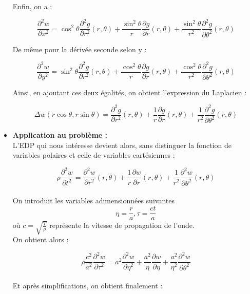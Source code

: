 \documentclass[a4,12pt]{article}
\begin{document}
\begin{itemize}
			      Enfin, on a :

			      \[
				\dfrac{\partial^2 w}{\partial x^2} = \cos^2 \theta \dfrac{\partial^2 g}{\partial r^2}(r,\theta) + \dfrac{\sin^2 \theta}{r} \dfrac{\partial g}{\partial r}(r,\theta) + \dfrac{\sin^2 \theta}{r^2} \dfrac{\partial^2 g}{\partial \theta^2}(r,\theta)
			      \]

			      De même pour la dérivée seconde selon y :

			      \[
				\dfrac{\partial^2 w}{\partial y^2} = \sin^2 \theta \dfrac{\partial^2 g}{\partial r^2}(r,\theta) + \dfrac{\cos^2 \theta}{r} \dfrac{\partial g}{\partial r}(r,\theta) + \dfrac{\cos^2 \theta}{r^2} \dfrac{\partial^2 g}{\partial \theta^2}(r,\theta)
			      \]

			      Ainsi, en ajoutant ces deux égalités, on obtient l'expression du Laplacien :

			      \[
				\Delta w(r \cos \theta, r \sin \theta) = \dfrac{\partial^2 g}{\partial r^2}(r,\theta) + \dfrac{1}{r} \dfrac{\partial g}{\partial r}(r,\theta) + \dfrac{1}{r^2} \dfrac{\partial^2 g}{\partial \theta^2}(r,\theta)
			      \]


			    \item \textbf{Application au problème : }\\

			      L'EDP qui nous intéresse devient alors, sans distinguer la fonction de variables polaires et celle de variables cartésiennes :

			      \[
				\rho \dfrac{\partial^2 w}{\partial t^2} = \dfrac{\partial^2 w}{\partial r^2}(r,\theta) + \dfrac{1}{r} \dfrac{\partial w}{\partial r}(r,\theta) + \dfrac{1}{r^2} \dfrac{\partial^2 w}{\partial \theta^2}(r,\theta)
			      \]~\\

			      On introduit les variables adimensionnées suivantes 
			      \[
				\eta=\dfrac{r}{a},\tau=\dfrac{ct}{a}
			      \]
			      où $c=\sqrt{\frac{T}{\rho}}$ représente la vitesse de propagation  de l'onde.\\ 

			      On obtient alors :

			      \[
				\rho \dfrac{c^2}{a^2} \dfrac{\partial^2 w}{\partial \tau^2} = a^2  \dfrac{\partial^2 w}{\partial \eta^2}+\dfrac{a^2}{\eta}\dfrac{\partial w}{\partial \eta}+\dfrac{a^2}{\eta^2}\dfrac{\partial^2 w}{\partial \theta^2}
			      \]
			      ~\\
			      Et après simplifications, on obtient finalement :


\end{itemize}
\end{document}
